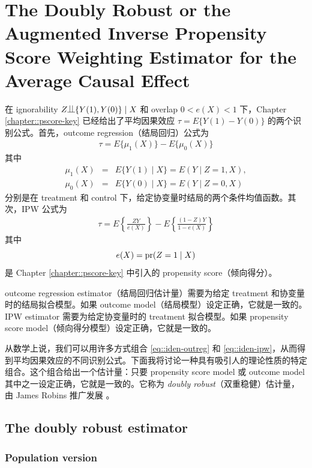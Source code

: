 
\chapter{The Doubly Robust or the Augmented Inverse Propensity Score Weighting Estimator for the Average Causal Effect}\label{chapter::doubly-robust}

在 ignorability $Z\ind \{ Y(1), Y(0) \} \mid X$ 和 overlap $0< e(X) < 1$ 下，Chapter \ref{chapter::pscore-key} 已经给出了平均因果效应 $\tau = E\{ Y(1) - Y(0)  \}$ 的两个识别公式。首先，outcome regression（结局回归）公式为
\begin{eqnarray}
\tau  =  E\{ \mu_1(X) \} - E\{ \mu_0(X) \} \label{eq::iden-outreg}
\end{eqnarray}
其中
\begin{eqnarray*}
\mu_1(X)  &=& E\{  Y(1) \mid X \} = E(Y\mid Z=1, X),\\ 
\mu_0(X) &=& E\{  Y(0) \mid X \} = E(Y\mid Z=0, X)
\end{eqnarray*}
分别是在 treatment 和 control 下，给定协变量时结局的两个条件均值函数。其次，IPW 公式为
\begin{eqnarray}
\tau = E\left\{  \frac{ZY}{e(X)}   \right\} - E\left\{  \frac{(1-Z)Y}{1-e(X)}   \right\} \label{eq::iden-ipw}
\end{eqnarray}
其中
$$
e(X) = \textup{pr}(Z=1\mid X)
$$
是 Chapter \ref{chapter::pscore-key} 中引入的 propensity score（倾向得分）。


outcome regression estimator（结局回归估计量）需要为给定 treatment 和协变量时的结局拟合模型。如果 outcome model（结局模型）设定正确，它就是一致的。IPW estimator 需要为给定协变量时的 treatment 拟合模型。如果 propensity score model（倾向得分模型）设定正确，它就是一致的。


从数学上说，我们可以用许多方式组合 \eqref{eq::iden-outreg} 和 \eqref{eq::iden-ipw}，从而得到平均因果效应的不同识别公式。下面我将讨论一种具有吸引人的理论性质的特定组合。这个组合给出一个估计量：只要 propensity score model 或 outcome model 其中之一设定正确，它就是一致的。它称为 {\it doubly robust}（双重稳健）估计量，由 James Robins 推广发展 \citep{scharfstein1999adjusting, bang2005doubly}。



\section{The doubly robust estimator}

\subsection{Population version}


